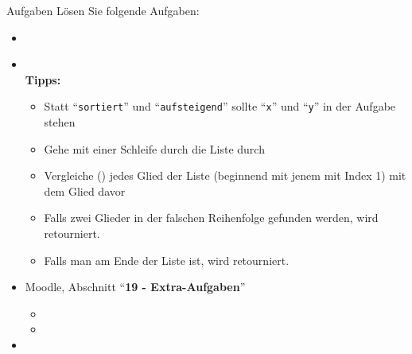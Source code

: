 \begin{frame}{Aufgaben}
	Lösen Sie folgende Aufgaben:
	\begin{itemize}
	    \item {}
	    \item {}\\
	    \textbf{Tipps:}
	    	    \begin{itemize}
	    	    	\item {} Statt ``\texttt{sortiert}'' und ``\texttt{aufsteigend}'' sollte ``\texttt{x}'' und ``\texttt{y}'' in der Aufgabe stehen
	    	    	\item Gehe mit einer Schleife durch die Liste durch
	    	    	\item Vergleiche () jedes Glied der Liste (beginnend mit jenem mit Index 1) mit dem Glied davor
	    	    	\item Falls zwei Glieder in der falschen Reihenfolge gefunden werden, wird  retourniert.
	    	    	\item Falls man am Ende der Liste ist, wird  retourniert.
	    	    \end{itemize}
	    \item Moodle, Abschnitt ``\textbf{19 -  Extra-Aufgaben}''
	    \begin{itemize}
	    \item {}
	    \item {}
	    \end{itemize}
	    \item {}
	\end{itemize}
\end{frame}


